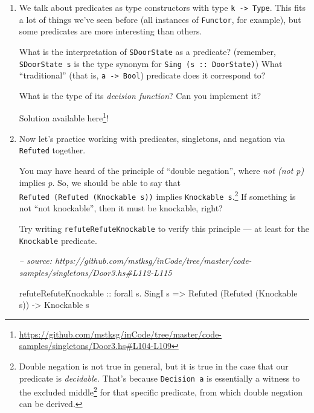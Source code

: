 \documentclass[]{article}
\newenvironment{Shaded}{}{}
\newcommand{\CommentTok}[1]{\textcolor[rgb]{0.38,0.63,0.69}{\textit{#1}}}
\newcommand{\DataTypeTok}[1]{\textcolor[rgb]{0.56,0.13,0.00}{#1}}
\newcommand{\FunctionTok}[1]{\textcolor[rgb]{0.02,0.16,0.49}{#1}}
\newcommand{\NormalTok}[1]{#1}
\newcommand{\OtherTok}[1]{\textcolor[rgb]{0.00,0.44,0.13}{#1}}
\renewcommand{\href}[2]{#2\footnote{\url{#1}}}
\begin{document}
\begin{enumerate}
\def\labelenumi{\arabic{enumi}.}
\item
  We talk about predicates as type constructors with type
  \texttt{k\ -\textgreater{}\ Type}. This fits a lot of things we've seen before
  (all instances of \texttt{Functor}, for example), but some predicates are more
  interesting than others.

  What is the interpretation of \texttt{SDoorState} as a predicate? (remember,
  \texttt{SDoorState\ s} is the type synonym for
  \texttt{Sing\ (s\ ::\ DoorState)}) What ``traditional'' (that is,
  \texttt{a\ -\textgreater{}\ Bool}) predicate does it correspond to?

  What is the type of its \emph{decision function}? Can you implement it?

  Solution available
  \href{https://github.com/mstksg/inCode/tree/master/code-samples/singletons/Door3.hs\#L104-L109}{here}!
\item
  Now let's practice working with predicates, singletons, and negation via
  \texttt{Refuted} together.

  You may have heard of the principle of ``double negation'', where \emph{not
  (not p)} implies \emph{p}. So, we should be able to say that
  \texttt{Refuted\ (Refuted\ (Knockable\ s))} implies
  \texttt{Knockable\ s}.\footnote{Double negation is not true in general, but it
    is true in the case that our predicate is \emph{decidable}. That's because
    \texttt{Decision\ a} is essentially a witness to the
    \href{https://en.wikipedia.org/wiki/Law_of_excluded_middle}{excluded middle}
    for that specific predicate, from which double negation can be derived.} If
  something is not ``not knockable'', then it must be knockable, right?

  Try writing \texttt{refuteRefuteKnockable} to verify this principle --- at
  least for the \texttt{Knockable} predicate.

\begin{Shaded}
\begin{Highlighting}[]
\CommentTok{-- source: https://github.com/mstksg/inCode/tree/master/code-samples/singletons/Door3.hs#L112-L115}

\NormalTok{refuteRefuteKnockable}
\OtherTok{    ::}\NormalTok{ forall s}\FunctionTok{.} \DataTypeTok{SingI}\NormalTok{ s}
    \OtherTok{=>} \DataTypeTok{Refuted}\NormalTok{ (}\DataTypeTok{Refuted}\NormalTok{ (}\DataTypeTok{Knockable}\NormalTok{ s))}
    \OtherTok{->} \DataTypeTok{Knockable}\NormalTok{ s}
\end{Highlighting}
\end{Shaded}


\end{enumerate}
\end{document}
